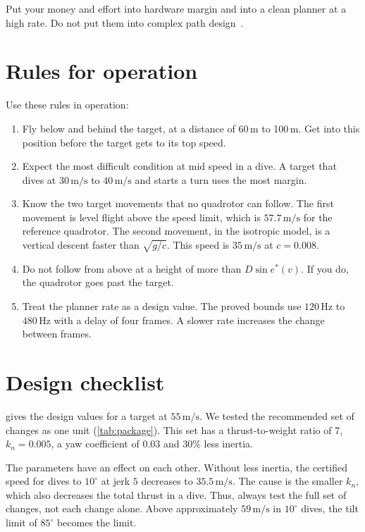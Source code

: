 \documentclass[11pt]{article}
\newcommand{\ms}{\,\mathrm{m/s}}
\begin{document}
Put your money and effort into hardware margin and into a clean planner at a high rate.
Do not put them into complex path design~\cite{mellinger2011}.

\section{Rules for operation}

Use these rules in operation:
\begin{enumerate}
\item Fly below and behind the target, at a distance of 60\,m to 100\,m.
Get into this position before the target gets to its top speed.
\item Expect the most difficult condition at mid speed in a dive.
A target that dives at $30\ms$ to $40\ms$ and starts a turn uses the most margin.
\item Know the two target movements that no quadrotor can follow.
The first movement is level flight above the speed limit, which is $57.7\ms$ for the reference
quadrotor.
The second movement, in the isotropic model, is a vertical descent faster than $\sqrt{g/c}$.
This speed is $35\ms$ at $c = 0.008$.
\item Do not follow from above at a height of more than $D\sin e^*(v)$.
If you do, the quadrotor goes past the target.
\item Treat the planner rate as a design value.
The proved bounds use $120$\,Hz to $480$\,Hz with a delay of four frames.
A slower rate increases the change between frames.
\end{enumerate}

\section{Design checklist}
\label{sec:checklist}

 gives the design values for a target at $55\ms$.
We tested the recommended set of changes as one unit (\cref{tab:package}).
This set has a thrust-to-weight ratio of 7, $k_n = 0.005$, a yaw coefficient of $0.03$ and
$30\%$ less inertia.

The parameters have an effect on each other.
Without less inertia, the certified speed for dives to $10^\circ$ at jerk $5$ decreases to $35.5\ms$.
The cause is the smaller $k_n$, which also decreases the total thrust in a dive.
Thus, always test the full set of changes, not each change alone.
Above approximately $59\ms$ in $10^\circ$ dives, the tilt limit of $85^\circ$ becomes the limit.
\end{document}
